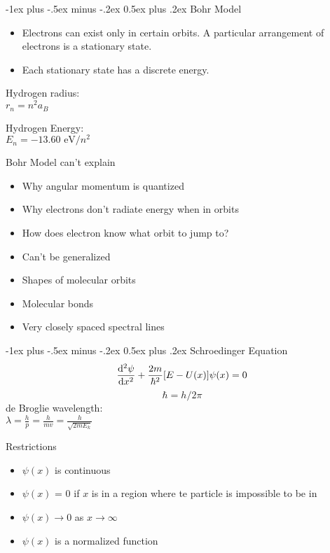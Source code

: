 \documentclass[12pt,landscape]{article}
\makeatletter
\renewcommand{\section}{\@startsection{section}{1}{0mm}%
	{-1ex plus -.5ex minus -.2ex}%
	{0.5ex plus .2ex}%
	{\normalfont\large\bfseries}}
\newcommand{\tab}{\hspace{.02\textwidth}}
\newcommand{\ds}{\displaystyle}
\makeatother
\begin{document}
\begin{multicols}{3}
\section{Bohr Model}
	\begin{itemize}[leftmargin=0.5cm]
		\itemsep0em
		\item Electrons can exist only in certain orbits. A particular arrangement of electrons is a stationary state.
		\item Each stationary state has a discrete energy.
	\end{itemize}

	Hydrogen radius:\\
	\tab $r_n = n^2 a_B$
	
	Hydrogen Energy:\\
	\tab $E_n = -13.60 \text{ eV} / n^2$
	
	Bohr Model can't explain
	\begin{itemize}[leftmargin=0.5cm]
		\itemsep0em
		\item Why angular momentum is quantized
		\item Why electrons don't radiate energy when in orbits
		\item How does electron know what orbit to jump to?
		\item Can't be generalized
		\item Shapes of molecular orbits
		\item Molecular bonds
		\item Very closely spaced spectral lines
	\end{itemize}

\section{Schroedinger Equation}
	$$\dv[2]{\psi}{x}+\frac{2m}{\hbar^2}[E - U(x)]\psi (x) = 0$$
	$$\hbar = h/2\pi$$
	de Broglie wavelength:\\
	\tab $ \ds \lambda = \frac{h}{p} = \frac{h}{mv} = \frac{h}{\sqrt{2m E_k}}$
	
	Restrictions
	\begin{itemize}[leftmargin=0.5cm]
		\itemsep0em
		\item $\psi (x)$ is continuous
		\item $\psi (x)$ = 0 if $x$ is in a region where te particle is impossible to be in
		\item $\psi (x) \rightarrow 0$ as $x \rightarrow \infty$
		\item $\psi (x)$ is a normalized function
	\end{itemize}


\end{multicols}
\end{document}
